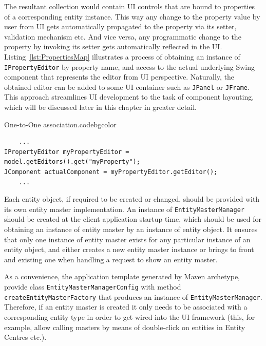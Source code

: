   The resultant collection would contain UI controls that are bound to properties of a corresponding entity instance.
  This way any change to the property value by user from UI gets automatically propagated to the property via its setter, validation mechanism etc.
  And vice versa, any programmatic change to the property by invoking its setter gets automatically reflected in the UI.
  Listing~\ref{lst:PropertiesMap} illustrates a process of obtaining an instance of \texttt{IPropertyEditor} by property name, and access to the actual underlying Swing component that represents the editor from UI perspective.
  Naturally, the obtained editor can be added to some UI container such as \texttt{JPanel} or \texttt{JFrame}.
  This approach streamlines UI development to the task of component layouting, which will be discussed later in this chapter in greater detail.
  
  
  \begin{code}{One-to-One association.}{\label{lst:PropertiesMap}}{codebgcolor}
    \begin{lstlisting}
    ...
IPropertyEditor myPropertyEditor = model.getEditors().get("myProperty");
JComponent actualComponent = myPropertyEditor.getEditor();
    ...
    \end{lstlisting}
  \end{code}
  
  
  Each entity object, if required to be created or changed, should be provided with its own entity master implementation. 
  An instance of \texttt{EntityMasterManager} should be created at the client application startup time, which should be used for obtaining an instance of entity master by an instance of entity object.
  It ensures that only one instance of entity master exists for any particular instance of an entity object, and either creates a new entity master instance or brings to front and existing one when handling a request to show an entity master.
  
  As a convenience, the application template generated by Maven archetype, provide class \texttt{EntityMasterManagerConfig} with method \texttt{createEntityMasterFactory} that produces an instance of \texttt{EntityMasterManager}.
  Therefore, if an entity master is created it only needs to be associated with a corresponding entity type in order to get wired into the UI framework (this, for example, allow calling masters by means of double-click on entities in Entity Centres etc.).
  
